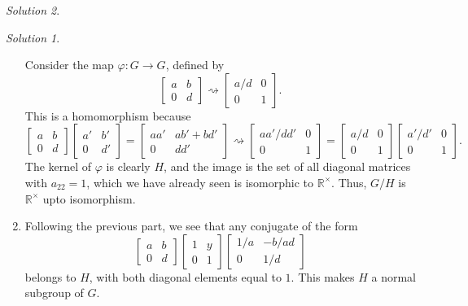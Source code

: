 \documentclass[11pt]{report}
\def\R{\mathbb{R}}
\theoremstyle{remark}
\newtheorem*{solution}{Solution}
\begin{document}
\begin{solution}
\begin{solution}
\begin{enumerate}
            Consider the map $\varphi \colon G \to G$, defined by \[
                \begin{bmatrix}
                    a & b \\ 0 & d
                \end{bmatrix} \rightsquigarrow \begin{bmatrix}
                    a / d & 0 \\ 0 & 1
                \end{bmatrix}.
            \] This is a homomorphism because \[
                \begin{bmatrix}
                    a & b \\ 0 & d
                \end{bmatrix} \begin{bmatrix}
                    a' & b' \\ 0 & d'
                \end{bmatrix} = \begin{bmatrix}
                    aa' & ab' + bd' \\ 0 & dd'
                \end{bmatrix} \rightsquigarrow \begin{bmatrix}
                    aa' / dd' & 0 \\ 0 & 1
                \end{bmatrix} = \begin{bmatrix}
                    a / d & 0 \\ 0 & 1
                \end{bmatrix} \begin{bmatrix}
                    a' / d' & 0 \\ 0 & 1
                \end{bmatrix}.
            \] The kernel of $\varphi$ is clearly $H$, and the image is the set of
            all diagonal matrices with $a_{22} = 1$, which we have already seen is
            isomorphic to $\R^\times$. Thus, $G / H$ is $\R^\times$ upto isomorphism.

            \item Following the previous part, we see that any conjugate of the form \[
                \begin{bmatrix}
                    a & b \\ 0 & d
                \end{bmatrix} \begin{bmatrix}
                    1 & y \\ 0 & 1
                \end{bmatrix} \begin{bmatrix}
                    1 / a & -b / ad \\ 0 & 1 / d
                \end{bmatrix}
            \] belongs to $H$, with both diagonal elements equal to $1$. This makes
            $H$ a normal subgroup of $G$.


\end{enumerate}
\end{solution}
\end{solution}
\end{document}
